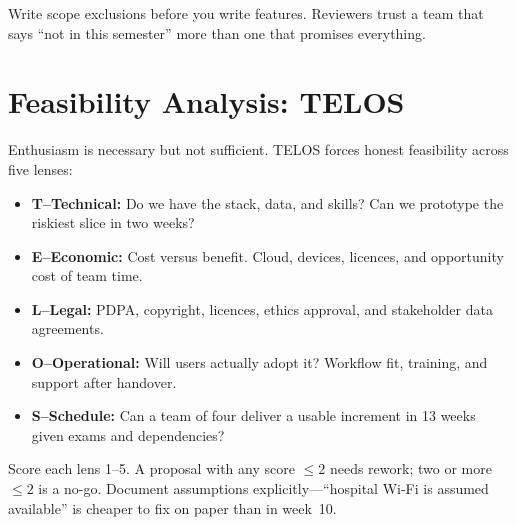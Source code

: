 Write scope exclusions before you write features. Reviewers trust a team that says ``not in this semester'' more than one that promises everything.

\section{Feasibility Analysis: TELOS}
\label{sec:feasibility}

Enthusiasm is necessary but not sufficient. TELOS forces honest feasibility across five lenses:
\begin{itemize}
    \item \textbf{T--Technical:} Do we have the stack, data, and skills? Can we prototype the riskiest slice in two weeks?
    \item \textbf{E--Economic:} Cost versus benefit. Cloud, devices, licences, and opportunity cost of team time.
    \item \textbf{L--Legal:} PDPA, copyright, licences, ethics approval, and stakeholder data agreements.
    \item \textbf{O--Operational:} Will users actually adopt it? Workflow fit, training, and support after handover.
    \item \textbf{S--Schedule:} Can a team of four deliver a usable increment in 13 weeks given exams and dependencies?
\end{itemize}
Score each lens 1--5. A proposal with any score $\le 2$ needs rework; two or more $\le 2$ is a no-go. Document assumptions explicitly---``hospital Wi-Fi is assumed available'' is cheaper to fix on paper than in week~10.

